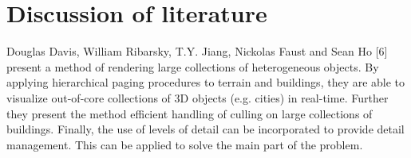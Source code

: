 \chapter{Discussion of literature}
Douglas Davis, William Ribarsky, T.Y. Jiang, Nickolas Faust and Sean Ho [6] present a method of rendering large collections of heterogeneous objects. By applying hierarchical paging procedures to terrain and buildings, they are able to visualize out-of-core collections of 3D objects (e.g. cities) in real-time.  Further they present the method efficient handling of culling on large collections of buildings. Finally, the use of levels of detail can be incorporated to provide detail management. This can be applied to solve the main part of the problem. 